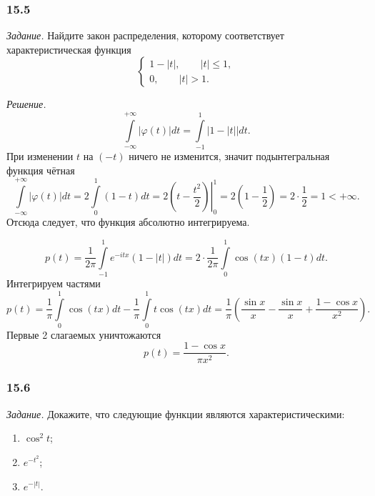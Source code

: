 \subsubsection*{15.5}

\textit{Задание.} Найдите закон распределения, которому соответствует характеристическая функция
$$ \begin{cases}
    1 - \left| t \right|, \qquad \left| t \right| \leq 1, \\
    0, \qquad \left| t \right| > 1.
  \end{cases}$$

\textit{Решение.}
$$ \int \limits_{- \infty }^{+ \infty } \left| \varphi \left( t \right) \right| dt =
  \int \limits_{- 1}^1 \left| 1 - \left| t \right| \right| dt.$$
При изменении $t$ на $ \left( - t \right) $ ничего не изменится,
значит подынтегральная функция чётная
$$ \int \limits_{- \infty }^{+ \infty } \left| \varphi \left( t \right) \right| dt =
  2 \int \limits_0^1 \left( 1 - t \right) dt =
  2 \left. \left( t - \frac{t^2}{2} \right) \right|_0^1 =
  2 \left( 1 - \frac{1}{2} \right) =
  2 \cdot \frac{1}{2} =
  1 < + \infty.$$
Отсюда следует, что функция абсолютно интегрируема.

$$p \left( t \right) =
  \frac{1}{2 \pi } \int \limits_{-1}^1 e^{- itx} \left( 1 - \left| t \right| \right) dt =
  2 \cdot \frac{1}{2 \pi } \int \limits_0^1 \cos \left( tx \right) \left( 1 - t \right) dt.$$
Интегрируем частями
$$p \left( t \right) =
  \frac{1}{ \pi } \int \limits_0^1 \cos \left( tx \right) dt -
  \frac{1}{ \pi } \int \limits_0^1 t \cos \left( tx \right) dt =
  \frac{1}{ \pi } \left( \frac{ \sin x}{x} - \frac{ \sin x}{x} + \frac{1 - \cos x}{x^2} \right).$$
Первые 2 слагаемых уничтожаются
$$p \left( t \right) =
  \frac{1 - \cos x}{ \pi x^2}.$$

\subsubsection*{15.6}

\textit{Задание.} Докажите, что следующие функции являются характеристическими:
\begin{enumerate}[label=\alph*)]
\item $ \cos^2 t$;
\item $e^{- t^2}$;
\item $e^{- \left| t \right| }$.
\end{enumerate}

